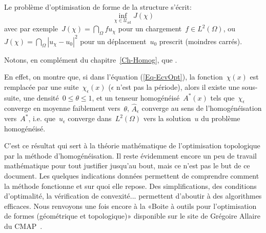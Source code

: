 Le problème d'optimisation de forme de la structure s'écrit:
\begin{equation}
\inf_{\chi\in\mathscr{U}_{\text{ad}}} J(\chi)
\end{equation}
avec par exemple~$J(\chi)=\dint_\Omega fu_\chi$ pour un chargement~$f\in L^2(\Omega)$, ou~$J(\chi)=\dint_\Omega|u_\chi-u_0|^2$ pour un déplacement~$u_0$ prescrit (moindres carrés).

\medskip
Notons, en complément du chapitre~\ref{Ch-Homog}, que .

En effet, on montre que, si dans l'équation (\ref{Eq-EcvOpt}), la fonction~$\chi(x)$ est remplacée par une suite~$\chi_\epsilon(x)$ ($\epsilon$ n'est pas la période), alors il existe une sous-suite, une densité~$0\le\theta\le1$, et un tenseur homogénéisé~$A^*(x)$ tels que~$\chi_\epsilon$ converge en moyenne faiblement vers~$\theta$, $\hat{A}_\epsilon$ converge au sens de l'homogénéisation vers~$A^*$, i.e. que~$u_\epsilon$ converge dans~$L^2(\Omega)$ vers la solution~$u$ du problème homogénéisé.

\medskip
C'est ce résultat qui sert à la théorie mathématique de l'optimisation topologique par la méthode d'homogénéisation.
Il reste évidemment encore un peu de travail mathématique pour tout justifier jusqu'au bout, mais ce n'est pas le but de ce document. Les quelques indications données permettent de comprendre comment la méthode fonctionne et sur quoi elle repose.
Des simplifications, des conditions d'optimalité, la vérification de convexité... permettent d'aboutir à des algorithmes efficaces. Nous renvoyons une fois encore à la «Boite à outils \freefem pour l'optimisation de formes (géométrique et topologique)» disponible sur le site de Grégoire Allaire du CMAP~\cite{bib-AllaireOptimFF}.

